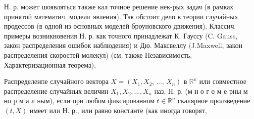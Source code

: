 \documentclass[10pt]{article}
\begin{document}
Н. р. может шоявляться также кал точное решение нек-рых задач (в рамках принятой математич. модели явления). Так обстоит дело в теории случайных продессов (в одной из основных моделей броуновского движения). Классич. примеры возникновения Н. р. как точного принадлежат К. Гауссу (C. Gauss, закон распределения ошибок наблюдения) и Дю. Максвеллу (J.Maxwell, закон распределения скоростей молекул) (см. также Независимость, Характеризационная теорема).



Распределенпе случайного вектора $X=\left(X_{1}, X_{2}\right.$, ..., $\left.X_{n}\right)$ в $\mathbb{R}^{n}$ или совместное распределение случайных величин $X_{1}, X_{2}, \ldots, X_{n}$ наз. Н. р. (м н о г о м е рны м но р м а л ным), если при любом фиксированном $t \in \mathbb{R}^{n}$ скалярное пролзведение $(t, X)$ имеет или Н. р., или равно константе (как иногда говорят,
\end{document}
